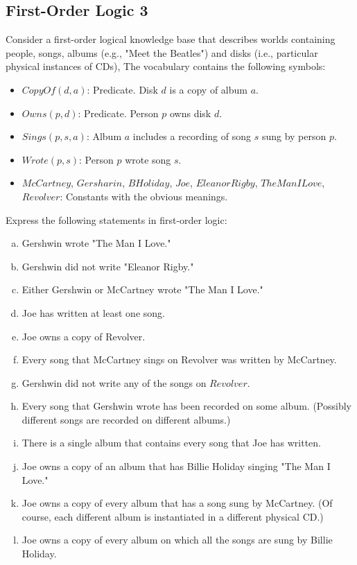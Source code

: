 \documentclass[11pt, answers]{exam}
\begin{document}
%
%
\begin{questions}
\section{First-Order Logic 3}
\question

Consider a first-order logical knowledge base that describes worlds containing people, songs, albums (e.g., "Meet the Beatles") and disks (i.e., particular physical instances of CDs), The vocabulary contains the following symbols:
\begin{itemize}
	\item $CopyOf(d,a)$: Predicate. Disk $d$ is a copy of album $a$.
	\item $Owns(p, d)$: Predicate. Person $p$ owns disk $d$.
	\item $Sings(p, s, a)$: Album $a$ includes a recording of song $s$ sung by person $p$. 
	\item $Wrote(p, s)$: Person $p$ wrote song $s$.
	\item $McCartney$, $Gersharin$, $BHoliday$, $Joe$, $EleanorRigby$, $TheManILove$, $Revolver$: Constants with the obvious meanings.
\end{itemize}

Express the following statements in first-order logic:
\begin{enumerate}[a.]
	\item Gershwin wrote "The Man I Love."
	\item Gershwin did not write "Eleanor Rigby."
	\item Either Gershwin or McCartney wrote "The Man I Love."
	\item Joe has written at least one song.
	\item Joe owns a copy of Revolver.
	\item Every song that McCartney sings on Revolver was written by McCartney.
	\item Gershwin did not write any of the songs on $Revolver$.
	\item Every song that Gershwin wrote has been recorded on some album. (Possibly different songs are recorded on different albums.)
	\item There is a single album that contains every song that Joe has written.
	\item Joe owns a copy of an album that has Billie Holiday singing "The Man I Love."
	\item Joe owns a copy of every album that has a song sung by McCartney. (Of course, each different album is instantiated in a different physical CD.)
	\item Joe owns a copy of every album on which all the songs are sung by Billie Holiday.
\end{enumerate}

\end{questions}
\end{document}
